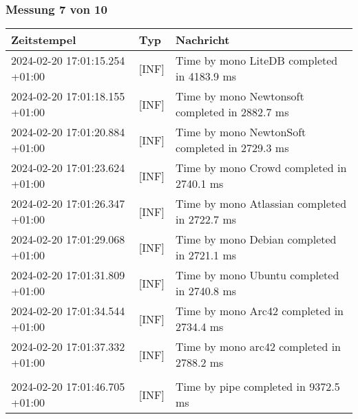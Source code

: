     \subsubsection{Messung 7 von 10} \label{subsubsec:LiteDbWenigerPaketeAlsDb7von10}
        {
            {\small
                \begin{tabularx}{\textwidth}{|l|l|X|}
                    \hline
                    \textbf{Zeitstempel} & \textbf{Typ} & \textbf{Nachricht} \\
                    \hline
                    \endhead
                    2024-02-20 17:01:15.254 +01:00 & [INF] & Time by mono LiteDB completed in 4183.9 ms \\
                    2024-02-20 17:01:18.155 +01:00 & [INF] & Time by mono Newtonsoft completed in 2882.7 ms \\
                    2024-02-20 17:01:20.884 +01:00 & [INF] & Time by mono NewtonSoft completed in 2729.3 ms \\
                    2024-02-20 17:01:23.624 +01:00 & [INF] & Time by mono Crowd completed in 2740.1 ms \\
                    2024-02-20 17:01:26.347 +01:00 & [INF] & Time by mono Atlassian completed in 2722.7 ms \\
                    2024-02-20 17:01:29.068 +01:00 & [INF] & Time by mono Debian completed in 2721.1 ms \\
                    2024-02-20 17:01:31.809 +01:00 & [INF] & Time by mono Ubuntu completed in 2740.8 ms \\
                    2024-02-20 17:01:34.544 +01:00 & [INF] & Time by mono Arc42 completed in 2734.4 ms \\
                    2024-02-20 17:01:37.332 +01:00 & [INF] & Time by mono arc42 completed in 2788.2 ms \\
                    & & \\
                    2024-02-20 17:01:46.705 +01:00 & [INF] & Time by pipe completed in 9372.5 ms \\
                    \hline
                \end{tabularx}
            }
        }

